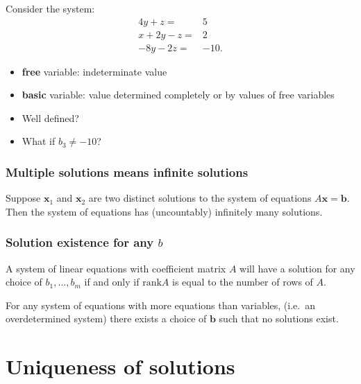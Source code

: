 \documentclass[compress]{beamer}
\newcommand{\rank}{\mathrm{rank}}
\begin{document}
\begin{frame}
  Consider the system:
  \begin{align*}
    4 y + z = & 5 \\    
    x + 2 y - z = & 2 \\
    -8y - 2z = & -10.
  \end{align*}
  \begin{itemize}
  \item \textbf{free} variable: indeterminate value
  \item \textbf{basic} variable: value determined completely or by
    values of free variables
  \item Well defined?
  \item What if $b_3 \neq -10$?
  \end{itemize}  
\end{frame}

\begin{frame}\frametitle{Multiple solutions means infinite solutions}
  \begin{lemma}\label{lem:sinf}
    Suppose $\mathbf{x}_1$ and $\mathbf{x}_2$ are two distinct
    solutions to the system of equations $A \mathbf{x} =
    \mathbf{b}$. Then the system of equations has (uncountably)
    infinitely many solutions.
  \end{lemma}
\end{frame}

\begin{frame}\frametitle{Solution existence for any $b$}
  \begin{theorem}\label{thm:sexist}
    A system of linear equations with coefficient matrix $A$ will have a
    solution for any choice of $b_1, ..., b_m$ if and only if $\rank A$
    is equal to the number of rows of $A$.
  \end{theorem}

  \begin{corollary}
    For any system of equations with more equations than variables,
    (i.e.\ an overdetermined system)
    there exists a choice of $\textbf{b}$ such that no solutions exist. 
  \end{corollary}
\end{frame}

\section{Uniqueness of solutions}
\end{document}
